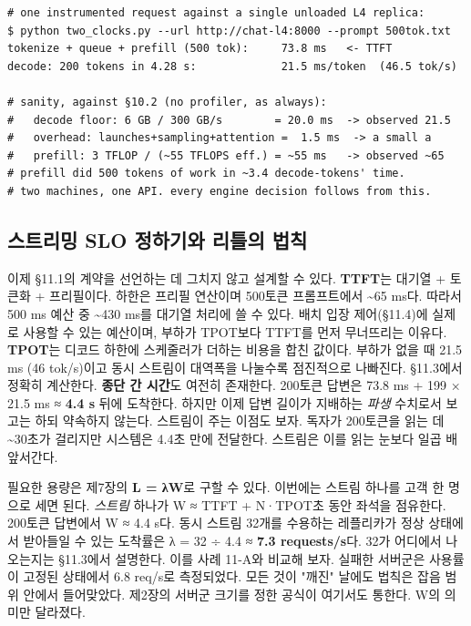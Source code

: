 \begin{terminalbox}
\begin{Verbatim}[breaklines=true,breakanywhere=true,fontsize=\small,formatcom=\color{tbbtermfg},codes=\tbbcodeactive]
# one instrumented request against a single unloaded L4 replica:
$ python two_clocks.py --url http://chat-l4:8000 --prompt 500tok.txt
tokenize + queue + prefill (500 tok):     73.8 ms   <- TTFT
decode: 200 tokens in 4.28 s:             21.5 ms/token  (46.5 tok/s)

# sanity, against §10.2 (no profiler, as always):
#   decode floor: 6 GB / 300 GB/s        = 20.0 ms  -> observed 21.5
#   overhead: launches+sampling+attention =  1.5 ms  -> a small a
#   prefill: 3 TFLOP / (~55 TFLOPS eff.) = ~55 ms   -> observed ~65
# prefill did 500 tokens of work in ~3.4 decode-tokens' time.
# two machines, one API. every engine decision follows from this.
\end{Verbatim}
\end{terminalbox}

\subsection*{스트리밍 SLO 정하기와 리틀의 법칙}

이제 §11.1의 계약을 선언하는 데 그치지 않고 설계할 수 있다. \textbf{TTFT}는 대기열 + 토큰화 + 프리필이다. 하한은 프리필 연산이며 500토큰 프롬프트에서 \textasciitilde{}65 ms다. 따라서 500 ms 예산 중 \textasciitilde{}430 ms를 대기열 처리에 쓸 수 있다. 배치 입장 제어(§11.4)에 실제로 사용할 수 있는 예산이며, 부하가 TPOT보다 TTFT를 먼저 무너뜨리는 이유다. \textbf{TPOT}는 디코드 하한에 스케줄러가 더하는 비용을 합친 값이다. 부하가 없을 때 21.5 ms (46 tok/s)이고 동시 스트림이 대역폭을 나눌수록 점진적으로 나빠진다. §11.3에서 정확히 계산한다. \textbf{종단 간 시간}도 여전히 존재한다. 200토큰 답변은 73.8 ms + 199 × 21.5 ms ≈ \textbf{4.4 s} 뒤에 도착한다. 하지만 이제 답변 길이가 지배하는 \textit{파생} 수치로서 보고는 하되 약속하지 않는다. 스트림이 주는 이점도 보자. 독자가 200토큰을 읽는 데 \textasciitilde{}30초가 걸리지만 시스템은 4.4초 만에 전달한다. 스트림은 이를 읽는 눈보다 일곱 배 앞서간다.

필요한 용량은 제7장의 \textbf{L = λW}로 구할 수 있다. 이번에는 스트림 하나를 고객 한 명으로 세면 된다. \textit{스트림} 하나가 W ≈ TTFT + N·TPOT초 동안 좌석을 점유한다. 200토큰 답변에서 W ≈ 4.4 s다. 동시 스트림 32개를 수용하는 레플리카가 정상 상태에서 받아들일 수 있는 도착률은 λ = 32 ÷ 4.4 ≈ \textbf{7.3 requests/s}다. 32가 어디에서 나오는지는 §11.3에서 설명한다. 이를 사례 11-A와 비교해 보자. 실패한 서버군은 사용률이 고정된 상태에서 6.8 req/s로 측정되었다. 모든 것이 "깨진" 날에도 법칙은 잡음 범위 안에서 들어맞았다. 제2장의 서버군 크기를 정한 공식이 여기서도 통한다. W의 의미만 달라졌다.

